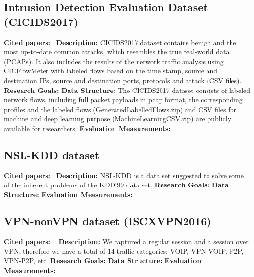\subsection{Intrusion Detection Evaluation Dataset (CICIDS2017)}
\textbf{Cited papers:}~\cite{sharafaldin2018toward} \newline
\textbf{Description:} CICIDS2017 dataset contains benign and the most up-to-date common attacks, which resembles the true real-world data (PCAPs). It also includes the results of the network traffic analysis using CICFlowMeter with labeled flows based on the time stamp, source and destination IPs, source and destination ports, protocols and attack (CSV files). \newline
\textbf{Research Goals:}  \newline
\textbf{Data Structure:} The CICIDS2017 dataset consists of labeled network flows, including full packet payloads in pcap format, the corresponding profiles and the labeled flows (GeneratedLabelledFlows.zip) and CSV files for machine and deep learning purpose (MachineLearningCSV.zip) are publicly available for researchers.\newline
\textbf{Evaluation Measurements:} \newline






\subsection{NSL-KDD dataset}
\textbf{Cited papers:}~\cite{tavallaee2009detailed} \newline
\textbf{Description:} NSL-KDD is a data set suggested to solve some of the inherent problems of the KDD'99 data set.  \newline
\textbf{Research Goals:}  \newline
\textbf{Data Structure:} \newline
\textbf{Evaluation Measurements:} \newline








\subsection{VPN-nonVPN dataset (ISCXVPN2016)}
\textbf{Cited papers:} ~\cite{draper2016characterization}\newline
\textbf{Description:} We captured a regular session and a session over VPN, therefore we have a total of 14 traffic categories: VOIP, VPN-VOIP, P2P, VPN-P2P, etc.\newline
\textbf{Research Goals:}  \newline
\textbf{Data Structure:} \newline
\textbf{Evaluation Measurements:} \newline











